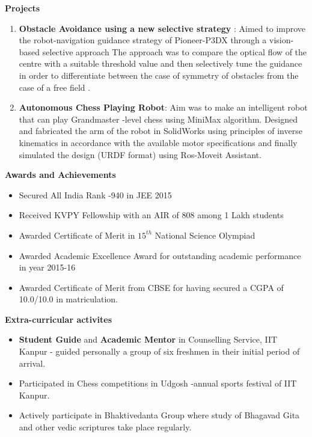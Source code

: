 \documentclass[a4paper,18pt]{article}
\begin{document}
\textbf{Projects}
\begin{enumerate}
\item \textbf{Obstacle Avoidance using a new selective strategy} : Aimed to improve the robot-navigation guidance strategy of Pioneer-P3DX through a vision-based selective approach
The approach was to compare the optical flow of the centre with a suitable threshold value and then selectively tune the
guidance in order to differentiate between the case of symmetry of obstacles from the case of a free field .
\item \textbf{Autonomous Chess Playing Robot}: Aim was to make an intelligent robot that can play Grandmaster -level chess using MiniMax algorithm. Designed and fabricated the arm of the robot in SolidWorks using principles of inverse kinematics in accordance with the available motor specifications and finally simulated the design (URDF format) using Ros-Moveit Assistant.
\end{enumerate}
\textbf{Awards and Achievements}
\renewcommand{\labelitemi}{\textendash}
\begin{itemize}
\item Secured All India Rank -940 in JEE 2015
\item Received KVPY Fellowship with an AIR of 808 among 1 Lakh students
\item Awarded Certificate of Merit in $15^{th}$ National Science Olympiad
\item Awarded Academic Excellence Award for outstanding academic performance in year 2015-16
\item Awarded Certificate of Merit from CBSE for having secured a CGPA of 10.0/10.0 in matriculation.
\end{itemize}
\textbf{Extra-curricular activites}
\renewcommand{\labelitemi}{\textendash}
\begin{itemize}
\item \textbf{Student Guide} and \textbf{Academic Mentor}  in Counselling Service, IIT Kanpur - guided personally a group of six freshmen in their initial period of arrival.
\item Participated in Chess competitions in Udgosh -annual sports festival of IIT Kanpur.
\item Actively participate in Bhaktivedanta Group where  study of Bhagavad Gita and other vedic scriptures take place regularly.
\end{itemize}
\end{document}
